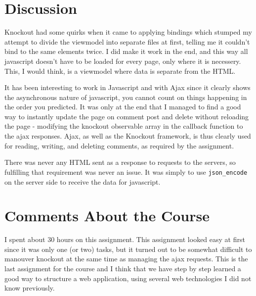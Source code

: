 \documentclass[a4paper]{scrreprt}
\newcommand{\code}[1]{\texttt{#1}}
\begin{document}
\chapter{Discussion}

Knockout had some quirks when it came to applying bindings which stumped my attempt to divide the viewmodel into separate files at first, telling me it couldn't bind to the same elements twice. I did make it work in the end, and this way all javascript doesn't have to be loaded for every page, only where it is necessery. This, I would think, is a viewmodel where data is separate from the HTML.

It has been interesting to work in Javascript and with Ajax since it clearly shows the asynchronous nature of javascript, you cannot count on things happening in the order you predicted. It was only at the end that I managed to find a good way to instantly update the page on comment post and delete without reloading the page - modifying the knockout observable array in the callback function to the ajax responses. Ajax, as well as the Knockout framework, is thus clearly used for reading, writing, and deleting comments, as required by the assignment.

There was never any HTML sent as a response to requests to the servers, so fulfilling that requirement was never an issue. It was simply to use \code{json\_encode} on the server side to receive the data for javascript.

\chapter{Comments About the Course}

I spent about 30 hours on this assignment.
This assignment looked easy at first since it was only one (or two) tasks, but it turned out to be somewhat difficult to manouver knockout at the same time as managing the ajax requests.
This is the last assignment for the course and I think that we have step by step learned a good way to structure a web application, using several web technologies I did not know previously.
\end{document}
